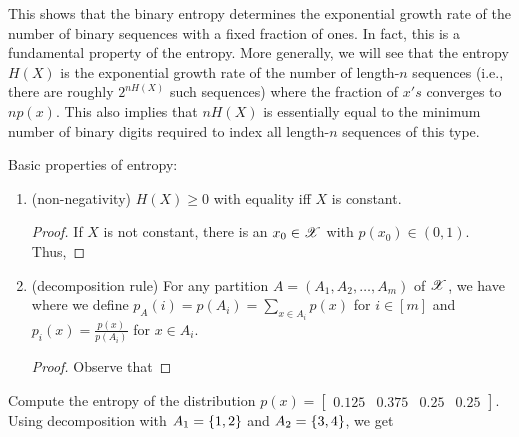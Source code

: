\documentclass[letterpaper,10pt,english]{article}
\begin{document}
\begin{rem} 
This shows that the binary entropy determines the exponential growth rate of the number of binary sequences with a fixed fraction of ones. 
In fact, this is a fundamental property of the entropy. 
More generally, we will see that the entropy $H (X)$ is the exponential growth rate of the number of length-$n$ sequences (i.e., there are roughly $2^{nH(X)}$ such sequences) where the fraction of $x's$ converges to $np(x)$. 
This also implies that $nH (X)$ is essentially equal to the minimum number of binary digits required to index all length-$n$ sequences of this type. 
\end{rem}
\begin{lem} 
Basic properties of entropy:
\begin{enumerate}
\item (non-negativity) $H (X) \ge 0$ with equality iff $X$ is constant. 
\begin{proof} 
If $X$ is not constant, there is an $x_0 \in \mathscr{X}$ with $p(x_0) \in (0,1)$. 
Thus, 
\end{proof}
\item (decomposition rule) For any partition $A = (A_1, A_2, \dots, A_m)$ of $\mathscr{X}$, we have 
where we define $p_A(i) = p(A_i) = \sum_{x \in A_i} p(x)$ for $i \in [m]$ and $p_i(x) = \frac{p(x)}{p(A_i)}$ for $x \in A_i$.
\begin{proof}
Observe that
\end{proof}
\end{enumerate}
\end{lem}
\begin{shaded*}\begin{exmp} 
Compute the entropy of the distribution $p(x) = \begin{bmatrix}0.125  & 0.375 & 0.25 &0.25\end{bmatrix}$. Using decomposition with $A_1 = \left\{1, 2\right\}$ and $A_2 = \left\{3, 4\right\}$, we get 
\end{exmp}\end{shaded*}
\end{document}
